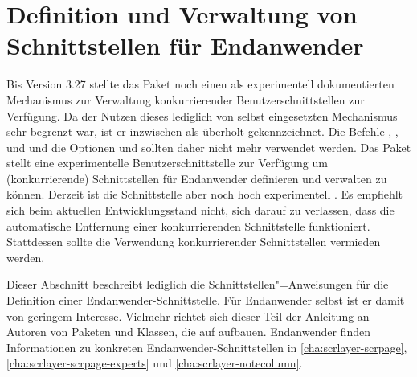 
\section{Definition und Verwaltung von Schnittstellen für Endanwender}

\iftrue%
Bis Version 3.27 stellte das Paket
 noch einen als experimentell dokumentierten Mechanismus zur
Verwaltung konkurrierender Benutzerschnittstellen zur Verfügung. Da der Nutzen
dieses lediglich von \KOMAScript{} selbst eingesetzten Mechanismus sehr
begrenzt war, ist er inzwischen als überholt gekennzeichnet. Die Befehle
,
,
 und
 und die
Optionen  und
 sollten daher
nicht mehr verwendet werden.%
\else%
Das Paket  stellt eine experimentelle Benutzerschnittstelle
zur Verfügung um (konkurrierende) Schnittstellen für Endanwender definieren
und verwalten zu können. %
Derzeit ist die Schnittstelle aber noch hoch
experimentell%
. Es empfiehlt sich beim aktuellen Entwicklungsstand nicht, sich darauf zu
verlassen, dass die automatische Entfernung einer konkurrierenden
Schnittstelle funktioniert. Stattdessen sollte die Verwendung konkurrierender
Schnittstellen vermieden werden.

Dieser Abschnitt beschreibt lediglich die Schnittstellen"=Anweisungen für die
Definition einer Endanwender-Schnittstelle. Für Endanwender selbst ist er
damit von geringem Interesse. Vielmehr richtet sich dieser Teil der Anleitung
an Autoren von Paketen und Klassen, die auf 
aufbauen. Endanwender finden Informationen zu konkreten
Endanwender-Schnittstellen in \autoref{cha:scrlayer-scrpage},
\autoref{cha:scrlayer-scrpage-experts} und \autoref{cha:scrlayer-notecolumn}.


